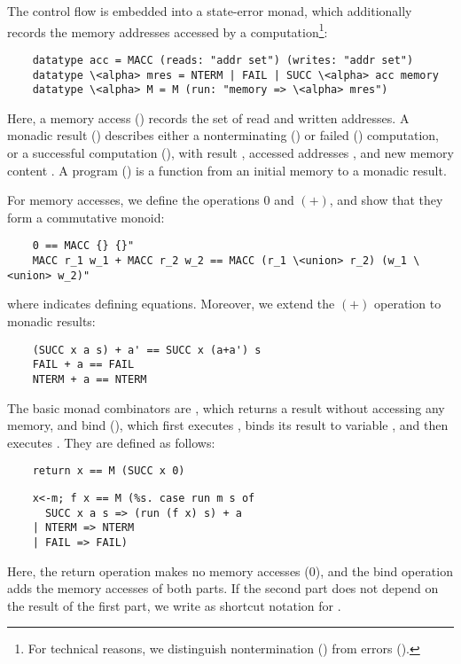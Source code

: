 \documentclass[runningheads]{llncs}
\begin{document}
  The control flow is embedded into a state-error monad, which additionally records the memory addresses accessed by a computation\footnote{For technical reasons, we distinguish nontermination () from errors ().}:
  \begin{lstlisting}
    datatype acc = MACC (reads: "addr set") (writes: "addr set")
    datatype \<alpha> mres = NTERM | FAIL | SUCC \<alpha> acc memory
    datatype \<alpha> M = M (run: "memory => \<alpha> mres")
  \end{lstlisting}
  Here, a memory access () records the set of read and written addresses.
  A monadic result () describes either a nonterminating () or failed ()
  computation, or a successful computation (), with result , accessed addresses , and new memory content .
  A program () is a function from an initial memory to a monadic result.

  For memory accesses, we define the operations \is$0$ and \is$(+)$, and show that they form a commutative monoid:
  \begin{lstlisting}
    0 == MACC {} {}"
    MACC r_1 w_1 + MACC r_2 w_2 == MACC (r_1 \<union> r_2) (w_1 \<union> w_2)"
  \end{lstlisting}
  where \is{==} indicates defining equations.
  Moreover, we extend the $(+)$ operation to monadic results:
  \begin{lstlisting}
    (SUCC x a s) + a' == SUCC x (a+a') s
    FAIL + a == FAIL
    NTERM + a == NTERM
  \end{lstlisting}

  The basic monad combinators are , which returns a result without accessing any memory,
  and bind (), which first executes , binds its result to variable , and then executes .
  They are defined as follows:
  \begin{lstlisting}
    return x == M (SUCC x 0)
  \end{lstlisting}%
  \vspace*{-1em}
  \begin{lstlisting}
    x<-m; f x == M (%s. case run m s of
      SUCC x a s => (run (f x) s) + a
    | NTERM => NTERM
    | FAIL => FAIL)
  \end{lstlisting}
  Here, the return operation makes no memory accesses ($0$),
  and the bind operation adds the memory accesses of both parts.
  If the second part does not depend on the result of the first part,
  we write  as shortcut notation for .
\end{document}
